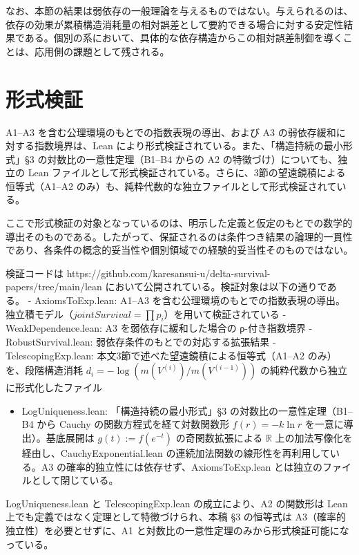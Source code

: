 \documentclass[12pt,a4paper]{article}
\begin{document}
なお、本節の結果は弱依存の一般理論を与えるものではない。与えられるのは、依存の効果が累積構造消耗量の相対誤差として要約できる場合に対する安定性結果である。個別の系において、具体的な依存構造からこの相対誤差制御を導くことは、応用側の課題として残される。

\section{形式検証}\label{ux5f62ux5f0fux691cux8a3c}

A1--A3 を含む公理環境のもとでの指数表現の導出、および A3 の弱依存緩和に対する指数境界は、Lean により形式検証されている。また、「構造持続の最小形式」§3 の対数比の一意性定理（B1--B4 からの A2 の特徴づけ）についても、独立の Lean ファイルとして形式検証されている。さらに、3節の望遠鏡積による恒等式（A1--A2 のみ）も、純粋代数的な独立ファイルとして形式検証されている。

ここで形式検証の対象となっているのは、明示した定義と仮定のもとでの数学的導出そのものである。したがって、保証されるのは条件つき結果の論理的一貫性であり、各条件の概念的妥当性や個別領域での経験的妥当性そのものではない。

検証コードは https://github.com/karesansui-u/delta-survival-papers/tree/main/lean において公開されている。検証対象は以下の通りである。 - AxiomsToExp.lean: A1--A3 を含む公理環境のもとでの指数表現の導出。独立積モデル（\(jointSurvival = \prod p_{i}\)）を用いて検証されている - WeakDependence.lean: A3 を弱依存に緩和した場合の ρ-付き指数境界 - RobustSurvival.lean: 弱依存条件のもとでの対応する拡張結果 - TelescopingExp.lean: 本文3節で述べた望遠鏡積による恒等式（A1--A2 のみ）を、段階構造消耗 \(d_i = -\log(m(V^{(i)})/m(V^{(i-1)}))\) の純粋代数から独立に形式化したファイル

\begin{itemize}
\tightlist
\item
  LogUniqueness.lean: 「構造持続の最小形式」§3 の対数比の一意性定理（B1--B4 から Cauchy の関数方程式を経て対数関数形 \(f(r) = -k \ln r\) を一意に導出）。基底展開は \(g(t) := f(e^{-t})\) の奇関数拡張による \(\mathbb{R}\) 上の加法写像化を経由し、CauchyExponential.lean の連続加法関数の線形性を再利用している。A3 の確率的独立性には依存せず、AxiomsToExp.lean とは独立のファイルとして閉じている。
\end{itemize}

LogUniqueness.lean と TelescopingExp.lean の成立により、A2 の関数形は Lean 上でも定義ではなく定理として特徴づけられ、本稿 §3 の恒等式は A3（確率的独立性）を必要とせずに、A1 と対数比の一意性定理のみから形式検証可能になっている。
\end{document}
